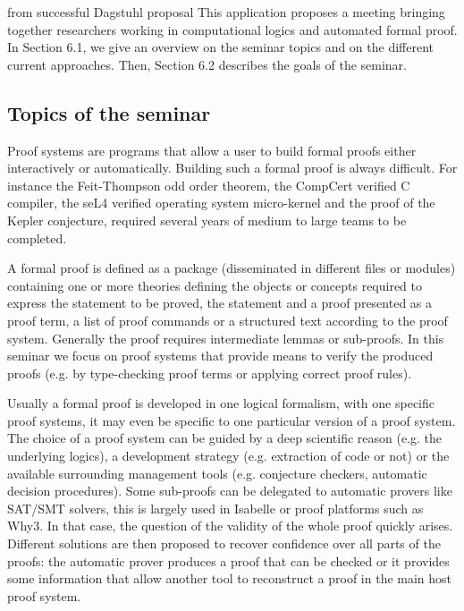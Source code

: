 \begin{oldpart}{from successful Dagstuhl proposal}
This application proposes a meeting bringing together researchers
working in computational logics and automated formal proof.
In Section 6.1, we give an overview on the seminar topics and on the
different current approaches. Then,  Section 6.2 describes the goals of the seminar.

\subsection{Topics of the seminar}

Proof systems are programs that allow a user to build formal proofs either
interactively or automatically. Building such a formal proof is
always difficult. For instance the Feit-Thompson odd order theorem,
the CompCert verified C compiler, the seL4 verified operating system
micro-kernel and the proof of the Kepler conjecture, required several
years of medium to large teams to be completed. 

A formal proof is defined as a package (disseminated in different
files or modules) containing one or more theories defining the
objects or concepts required to express the statement to be proved,
the statement and a proof presented as a proof term, a list of proof
commands or a structured text according to the proof system. Generally
the proof requires intermediate lemmas or sub-proofs. 
In this seminar we focus on proof systems that provide means to verify
the produced proofs (e.g. by type-checking proof terms or applying
correct proof rules). 

Usually a formal proof is developed in one logical formalism, with
one specific proof systems, it may even be specific to one particular
version of a proof system. The choice of a proof system
can be guided by a deep scientific reason (e.g. the underlying
logics), a development strategy (e.g. extraction of code or not) or
the available surrounding management tools  (e.g. conjecture checkers,
automatic decision procedures). Some sub-proofs can be delegated to
automatic provers like SAT/SMT solvers, this is largely used in
Isabelle or proof platforms such as Why3. In that case, the question
of the validity of the whole proof quickly arises. Different solutions
are then proposed  to recover confidence over all parts of the proofs:
the automatic prover produces a proof that can be checked or it
provides some information that allow another tool to reconstruct a proof in the main host proof system.


\end{oldpart}
